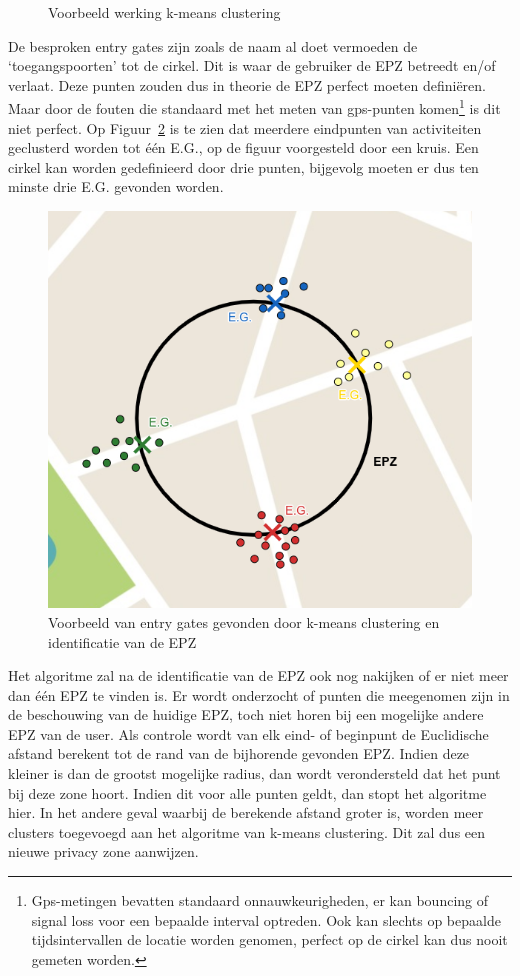 \begin{figure}[h]
\begin{subfigure}[b]{.33\textwidth}
    \end{subfigure}
    \caption{Voorbeeld werking k-means clustering~\cite{InDepthk59:online}}\label{fig:kmeans}
\end{figure}

De besproken entry gates zijn zoals de naam al doet vermoeden de
`toegangspoorten' tot de cirkel. Dit is waar de gebruiker de \ac{EPZ} betreedt
en/of verlaat. Deze punten zouden dus in theorie de \ac{EPZ} perfect moeten
definiëren. Maar door de fouten die standaard met het meten van gps-punten
komen\footnote{Gps-metingen bevatten standaard onnauwkeurigheden, er kan
    bouncing of signal loss voor een bepaalde interval optreden. Ook kan slechts op
    bepaalde tijdsintervallen de locatie worden genomen, perfect op de cirkel kan
    dus nooit gemeten worden.} is dit niet perfect. Op Figuur~\ref{fig:entrygate}
is te zien dat meerdere eindpunten van activiteiten geclusterd worden tot één
\ac{E.G.}, op de figuur voorgesteld door een kruis. Een cirkel kan worden
gedefinieerd door drie punten, bijgevolg moeten er dus ten minste drie
\ac{E.G.} gevonden worden.
\begin{figure}
    \centering
    \includegraphics[width=0.5\linewidth]{fig/EPZ-mechanisme/Entry_Gate.png}
    \caption{Voorbeeld van entry gates gevonden door k-means clustering en identificatie van de \ac{EPZ}}\label{fig:entrygate}
\end{figure}

Het algoritme zal na de identificatie van de \ac{EPZ} ook nog nakijken of er
niet meer dan één \ac{EPZ} te vinden is. Er wordt onderzocht of punten die
meegenomen zijn in de beschouwing van de huidige \ac{EPZ}, toch niet horen bij
een mogelijke andere \ac{EPZ} van de user. Als controle wordt van elk eind- of
beginpunt de Euclidische afstand berekent tot de rand van de bijhorende
gevonden \ac{EPZ}. Indien deze kleiner is dan de grootst mogelijke radius, dan
wordt verondersteld dat het punt bij deze zone hoort. Indien dit voor alle
punten geldt, dan stopt het algoritme hier. In het andere geval waarbij de
berekende afstand groter is, worden meer clusters toegevoegd aan het algoritme
van k-means clustering. Dit zal dus een nieuwe privacy zone aanwijzen.

